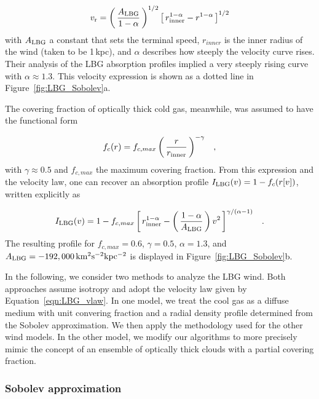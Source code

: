 \documentclass[12pt,preprint]{aastex}
\begin{document}
\begin{equation}
v_{\rm r} = \left ( \, \frac{A_{\rm LBG}}{1-\alpha} \, \right )^{1/2} \left [ \, r_{\rm
  inner}^{1-\alpha} - r^{1-\alpha} \, \right ]^{1/2}
\label{eqn:LBG_vlaw}
\end{equation}
with $A_{\rm LBG}$ a constant that sets the terminal speed,
$r_{inner}$ is the inner radius of the wind (taken to be 1\,kpc), and
$\alpha$ describes how steeply the velocity curve rises.  Their
analysis of the LBG absorption profiles implied
a very steeply rising curve with $\alpha \approx 1.3$.
This velocity expression is shown as a dotted line in 
Figure~\ref{fig:LBG_Sobolev}a.  

The covering fraction of optically thick cold gas, meanwhile, was assumed to have
the functional form

\begin{equation}
f_c(r) = f_{c,max} \left ( \, \frac{r}{r_{\rm inner}} \, \right )^{-\gamma} \;\;\; ,
\label{eqn:covering}
\end{equation}
with $\gamma \approx 0.5$ and $f_{c,max}$ the maximum covering
fraction.  From this expression and the velocity law, one can recover
an absorption profile $I_{\rm LBG}(v) = 1 - f_c(r[v])$, written
explicitly as

\begin{equation}
I_{\rm LBG}(v) = 1 - f_{c,max} \left [ \, r_{\rm inner}^{1-\alpha} - \left ( \,
\frac{1-\alpha}{A_{\rm LBG}} \, \right ) v^2 \, \right ]^{\gamma/(\alpha-1)}
\;\;\; .
\label{eqn:LBG_I}
\end{equation}
The resulting profile for $f_{c,max} = 0.6$, $\gamma=0.5$,
$\alpha=1.3$, and $A_{\rm LBG} = -192,000 \, \rm km^2 s^{-2} kpc^{-2}$ 
is displayed in Figure~\ref{fig:LBG_Sobolev}b.  

In the following, we consider two methods to analyze the LBG wind.
Both approaches assume isotropy and adopt the velocity law given by
Equation~\ref{eqn:LBG_vlaw}.  In one model, we treat the cool gas as a
diffuse medium with unit convering fraction and a radial density
profile determined from the Sobolev approximation.  We then apply 
the methodology used for the other wind models.  In the other model,
we modify our algorithms to more precisely mimic the concept of an
ensemble of optically thick clouds with a partial covering fraction.

\subsubsection{Sobolev approximation}
\label{sec:Sobolev}
\end{document}
